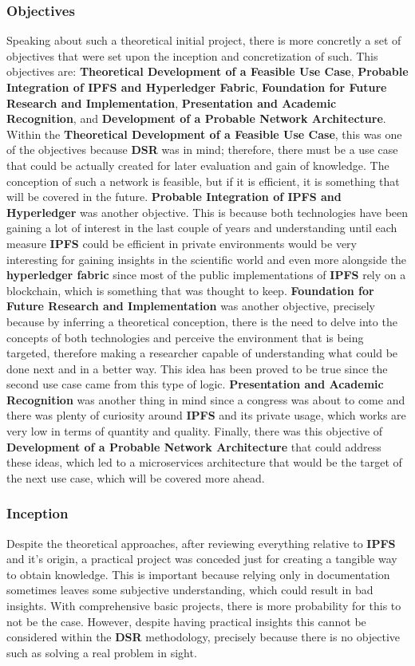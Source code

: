 \subsubsection{Objectives}
Speaking about such a theoretical initial project, there is more concretly a set of objectives that were set upon the 
inception and concretization of such. This objectives are: \textbf{Theoretical Development of a Feasible Use Case}, 
\textbf{Probable Integration of IPFS and Hyperledger Fabric}, \textbf{Foundation for Future Research and Implementation}, 
\textbf{Presentation and Academic Recognition}, and \textbf{Development of a Probable Network Architecture}. Within the 
\textbf{Theoretical Development of a Feasible Use Case}, this was one of the objectives because \textbf{DSR} was in mind; therefore, 
there must be a use case that could be actually created for later evaluation and gain of knowledge. The conception of such a network is 
feasible, but if it is efficient, it is something that will be covered in the future. \textbf{Probable Integration of IPFS and Hyperledger} 
was another objective. This is because both technologies have been gaining a lot of interest in the last couple of years and understanding 
until each measure \textbf{IPFS} could be efficient in private environments would be very interesting for gaining insights in the 
scientific world and even more alongside the \textbf{hyperledger fabric} since most of the public implementations of \textbf{IPFS} 
rely on a blockchain, which is something that was thought to keep. \textbf{Foundation for Future Research and Implementation} was another 
objective, precisely because by inferring a theoretical conception, there is the need to delve into the concepts of both technologies and 
perceive the environment that is being targeted, therefore making a researcher capable of understanding what could be done next and in 
a better way. This idea has been proved to be true since the second use case came from this type of logic. \textbf{Presentation and 
Academic Recognition} was another thing in mind since a congress was about to come and there was plenty of curiosity around \textbf{IPFS} 
and its private usage, which works are very low in terms of quantity and quality. Finally, there was this objective of 
\textbf{Development of a Probable Network Architecture} that could address these ideas, which led to a microservices architecture 
that would be the target of the next use case, which will be covered more ahead.

\subsubsection{Inception}
Despite the theoretical approaches, after reviewing everything relative to \textbf{IPFS} and it's origin, a practical project was conceded 
just for creating a tangible way to obtain knowledge. This is important because relying only in documentation sometimes leaves some 
subjective understanding, which could result in bad insights. With comprehensive basic projects, there is more probability for this to 
not be the case. However, despite having practical insights this cannot be considered within the \textbf{DSR} methodology, precisely 
because there is no objective such as solving a real problem in sight.

